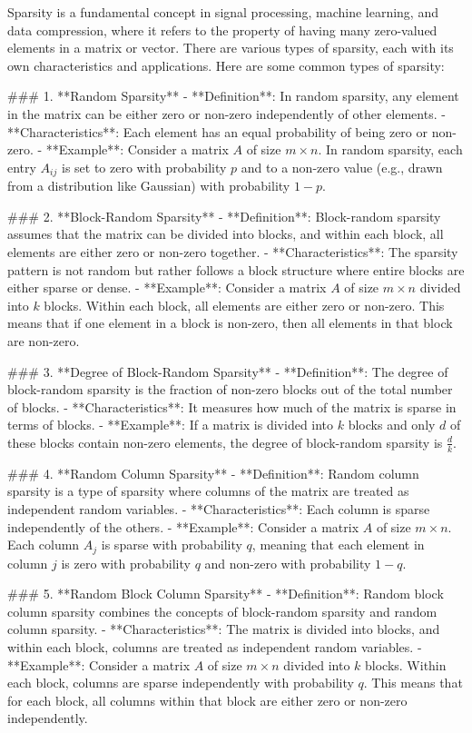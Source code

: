 Sparsity is a fundamental concept in signal processing, machine learning, and data compression, where it refers to the property of having many zero-valued elements in a matrix or vector. There are various types of sparsity, each with its own characteristics and applications. Here are some common types of sparsity:

### 1. **Random Sparsity**
- **Definition**: In random sparsity, any element in the matrix can be either zero or non-zero independently of other elements.
- **Characteristics**: Each element has an equal probability of being zero or non-zero.
- **Example**: Consider a matrix \( A \) of size \( m \times n \). In random sparsity, each entry \( A_{ij} \) is set to zero with probability \( p \) and to a non-zero value (e.g., drawn from a distribution like Gaussian) with probability \( 1 - p \).

### 2. **Block-Random Sparsity**
- **Definition**: Block-random sparsity assumes that the matrix can be divided into blocks, and within each block, all elements are either zero or non-zero together.
- **Characteristics**: The sparsity pattern is not random but rather follows a block structure where entire blocks are either sparse or dense.
- **Example**: Consider a matrix \( A \) of size \( m \times n \) divided into \( k \) blocks. Within each block, all elements are either zero or non-zero. This means that if one element in a block is non-zero, then all elements in that block are non-zero.

### 3. **Degree of Block-Random Sparsity**
- **Definition**: The degree of block-random sparsity is the fraction of non-zero blocks out of the total number of blocks.
- **Characteristics**: It measures how much of the matrix is sparse in terms of blocks.
- **Example**: If a matrix is divided into \( k \) blocks and only \( d \) of these blocks contain non-zero elements, the degree of block-random sparsity is \( \frac{d}{k} \).

### 4. **Random Column Sparsity**
- **Definition**: Random column sparsity is a type of sparsity where columns of the matrix are treated as independent random variables.
- **Characteristics**: Each column is sparse independently of the others.
- **Example**: Consider a matrix \( A \) of size \( m \times n \). Each column \( A_j \) is sparse with probability \( q \), meaning that each element in column \( j \) is zero with probability \( q \) and non-zero with probability \( 1 - q \).

### 5. **Random Block Column Sparsity**
- **Definition**: Random block column sparsity combines the concepts of block-random sparsity and random column sparsity.
- **Characteristics**: The matrix is divided into blocks, and within each block, columns are treated as independent random variables.
- **Example**: Consider a matrix \( A \) of size \( m \times n \) divided into \( k \) blocks. Within each block, columns are sparse independently with probability \( q \). This means that for each block, all columns within that block are either zero or non-zero independently.

